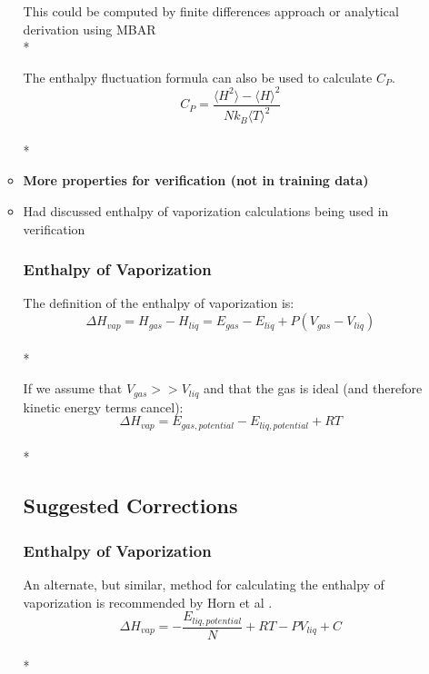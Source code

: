 \documentclass[aps,pre,nofootinbib,superscriptaddress,linenumbers,10pt, draft,tightenlines]{revtex4-1}
\begin{document}
\begin{itemize}
\begin{itemize}
    	This could be computed by finite differences approach or analytical derivation using MBAR\\*
    	
    	The enthalpy fluctuation formula can also be used to calculate $C_P$.
    	\begin{equation}C_P = \frac{\langle H^2 \rangle - \langle H \rangle^2}{N k_B \langle T \rangle^2}\end{equation}\\*
    	
    	
    	\item \textbf{More properties for verification (not in training data)}
    	\item Had discussed enthalpy of vaporization calculations being used in verification 
    	\subsubsection{Enthalpy of Vaporization}
    	
    	The definition of the enthalpy of vaporization is:
    	\begin{equation}\Delta H_{vap} = H_{gas} - H_{liq} = E_{gas} - E_{liq} + P(V_{gas} - V_{liq})\end{equation}\\*
    	
    	If we assume that $V_{gas} >> V_{liq}$ and that the gas is ideal (and therefore kinetic energy terms cancel):
    	\begin{equation}\Delta H_{vap} = E_{gas, potential} - E_{liq, potential} + R T\end{equation}\\*
    	

    	\subsection{Suggested Corrections}
    	\subsubsection{Enthalpy of Vaporization}
    	An alternate, but similar, method for calculating the enthalpy of vaporization is recommended by Horn et al \cite{tip4pew}.
    	\begin{equation}\Delta H_{vap} = -\frac{E_{liq, potential}}{N} + R T - P V_{liq} + C\end{equation}\\*
    	

\end{itemize}
\end{itemize}
\end{document}
